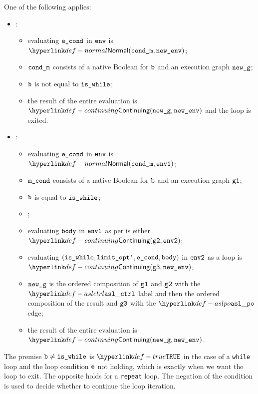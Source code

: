 \ProseParagraph
One of the following applies:
\begin{itemize}
\item {}:
  \begin{itemize}
    \item evaluating $\texttt{e\_cond}$ in $\texttt{env}$ is $\Normal(\condm, \newenv)$\ProseOrAbnormal;
    \item $\texttt{cond\_m}$ consists of a native Boolean for $\texttt{b}$ and an execution graph $\texttt{new\_g}$;
    \item $\texttt{b}$ is not equal to $\texttt{is\_while}$;
    \item the result of the entire evaluation is $\Continuing(\newg, \newenv)$
    and the loop is exited.
  \end{itemize}
\item {}:
  \begin{itemize}
    \item evaluating $\texttt{e\_cond}$ in $\texttt{env}$ is $\Normal(\condm, \envone)$;
    \item $\texttt{m\_cond}$ consists of a native Boolean for $\texttt{b}$ and an execution graph $\texttt{g1}$;
    \item $\texttt{b}$ is equal to $\texttt{is\_while}$;
    \item \Proseticklooplimit{$\vlimitopt$}{$\vlimitoptp$}\ProseOrError;
    \item evaluating $\texttt{body}$ in $\texttt{env1}$ as per  is either \\
    $\Continuing(\vgtwo, \envtwo)$\ProseTerminateAs{\ReturningConfig, \ThrowingConfig, \DynErrorConfig};
    \item evaluating $(\texttt{is\_while}, \texttt{limit\_opt'}, \texttt{e\_cond}, \texttt{body})$ in $\texttt{env2}$ as a loop is \\
    $\Continuing(\vgthree, \newenv)$\ProseTerminateAs{\ReturningConfig, \ThrowingConfig, \DynErrorConfig};
    \item $\texttt{new\_g}$ is the ordered composition of $\texttt{g1}$ and $\texttt{g2}$ with the $\aslctrl$ label
    and then the ordered composition of the result and $\texttt{g3}$ with the $\aslpo$ edge;
    \item the result of the entire evaluation is $\Continuing(\newg, \newenv)$.
  \end{itemize}
\end{itemize}

\FormallyParagraph
The premise $\texttt{b} \neq \texttt{is\_while}$ is $\True$ in the case of a \texttt{while} loop
and the loop condition $\texttt{e}$ not holding, which is exactly when we want the
loop to exit. The opposite holds for a \texttt{repeat} loop.
The negation of the condition is used to decide whether to continue the loop iteration.

